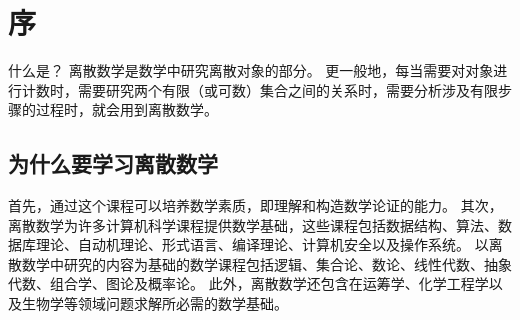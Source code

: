 \chapter{序}
{
    什么是？
    离散数学是数学中研究离散对象的部分。
    更一般地，每当需要对对象进行计数时，需要研究两个有限（或可数）集合之间的关系时，需要分析涉及有限步骤的过程时，就会用到离散数学。

    \section{为什么要学习离散数学}
    {
        首先，通过这个课程可以培养数学素质，即理解和构造数学论证的能力。
        其次，离散数学为许多计算机科学课程提供数学基础，这些课程包括数据结构、算法、数据库理论、自动机理论、形式语言、编译理论、计算机安全以及操作系统。
        以离散数学中研究的内容为基础的数学课程包括逻辑、集合论、数论、线性代数、抽象代数、组合学、图论及概率论。
        此外，离散数学还包含在运筹学、化学工程学以及生物学等领域问题求解所必需的数学基础。
    }
}

\cleardoublepage

\endinput
